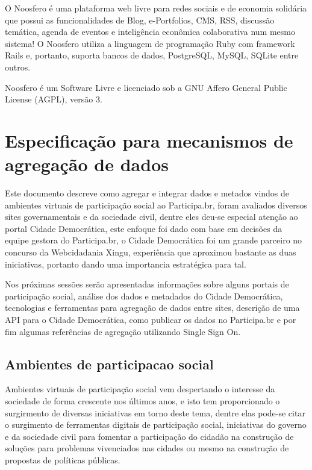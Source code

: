 \documentclass[12pt]{article}
\begin{document}
O Noosfero\cite{noosfero} é uma plataforma web livre para redes sociais e de
economia solidária que possui as funcionalidades de Blog, e-Portfolios, CMS,
RSS, discussão temática, agenda de eventos e inteligência econômica
colaborativa num mesmo sistema! O Noosfero utiliza a linguagem de programação
Ruby com framework Rails e, portanto, suporta bancos de dados, PostgreSQL,
MySQL, SQLite entre outros.

Noosfero é um Software Livre e licenciado sob a GNU Affero General Public
License (AGPL), versão 3.

\section{Especificação para mecanismos de agregação de dados}

Este documento descreve como agregar e integrar dados e metados vindos de
ambientes virtuais de participação social ao Participa.br, foram avaliados
diversos sites governamentais e da sociedade civil, dentre eles deu-se
especial atenção ao portal Cidade Democrática, este enfoque foi dado com base
em decisões da equipe gestora do Participa.br, o Cidade Democrática foi um
grande parceiro no concurso da Webcidadania Xingu, experiência que aproximou
bastante as duas iniciativas, portanto dando uma importancia estratégica para
tal.

Nos próximas sessões serão apresentadas informações sobre alguns portais de
participação social, análise dos dados e metadados do Cidade Democrática,
tecnologias e ferramentas para agregação de dados entre sites, descrição de
uma API para o Cidade Democrática, como publicar os dados no Participa.br e
por fim algumas referências de agregação utilizando Single Sign On.

\subsection{Ambientes de participacao social}

Ambientes virtuais de participação social vem despertando o interesse da
sociedade de forma crescente nos últimos anos, e isto tem proporcionado o
surgirmento de diversas iniciativas em torno deste tema, dentre elas pode-se
citar o surgimento de ferramentas digitais de participação social, iniciativas
do governo e da sociedade civil para fomentar a participação do cidadão na
construção de soluções para problemas vivenciados nas cidades ou mesmo na
construção de propostas de políticas públicas.
\end{document}
